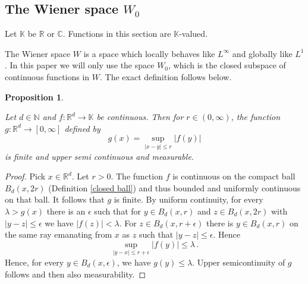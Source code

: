 \documentclass[12pt,reqno]{amsart}
\theoremstyle{plain}
\newtheorem{proposition}[theorem]{Proposition}
\numberwithin{equation}{section}
\theoremstyle{remark}
\newcommand{\uses}[1]{}
\newcommand{\usesdefs}[1]{}
\newcommand{\leanok}{}
\newcommand{\lean}[1]{}
\newcommand{\R}{{\mathbb R}}
\newcommand{\N}{{\mathbb N}}
\newcommand{\C}{{\mathbb C}}
\begin{document}
\subsection{The Wiener space \texorpdfstring{$W_0$}{}}\label{sec:wiener}
Let $\mathbb{K}$ be $\R$ or $\C$.
Functions in this section are $\mathbb{K}$-valued.


The  Wiener space $W$ is a space which locally behaves like $L^\infty$ and globally like $L^1$
\cite{Wiener32,Groechenig}. 
In this paper we will only use the space $W_0$, which is the closed subspace of continuous functions in $W$.
The exact definition follows below.

\begin{proposition}\label{auto:local-supremum-measurability}\uses{}\usesdefs{closed ball}
\lean{Auto.localSupremumMeasurability}
\leanok
Let $d\in \N$ and $f:\R^d\to \mathbb{K}$ be continuous.
Then for $r\in (0,\infty)$, the function $g:\R^d\to [0,\infty]$  defined by
\begin{equation}\label{auto:local-supremum-function}
    g(x)=\sup_{|x-y|\le r}|f(y)|
\end{equation}
is finite and upper semi continuous and measurable.
\end{proposition}
\begin{proof}
 Pick $x\in \R^d$. Let $r>0$.
 The function $f$ is continuous on the compact ball $B_d(x,2r)$ (Definition \ref{closed ball}) and thus bounded and uniformly continuous on that ball. It follows that $g$ is finite. By uniform continuity, for every $\lambda>g(x)$ there is an $\epsilon$ such that for $y\in B_d(x,r)$ and $z\in B_d(x,2r)$ with $|y-z|\le \epsilon$ we have
 $|f(z)|<\lambda$. For $z\in B_d(x,r+\epsilon)$
 there is $y\in B_d(x,r)$ on the same ray emanating from $x$ as $z$ such that $|y-z|\le \epsilon$.
 Hence
 \begin{equation}
     \sup_{|y-x|\le r+\epsilon}|f(y)|\le \lambda \, .
 \end{equation}
 Hence, for  every $y\in B_d(x,\epsilon)$, we have
 $g(y)\le \lambda$. Upper semicontinuity of $g$ follows and then also measurability.
 \end{proof}
\end{document}

